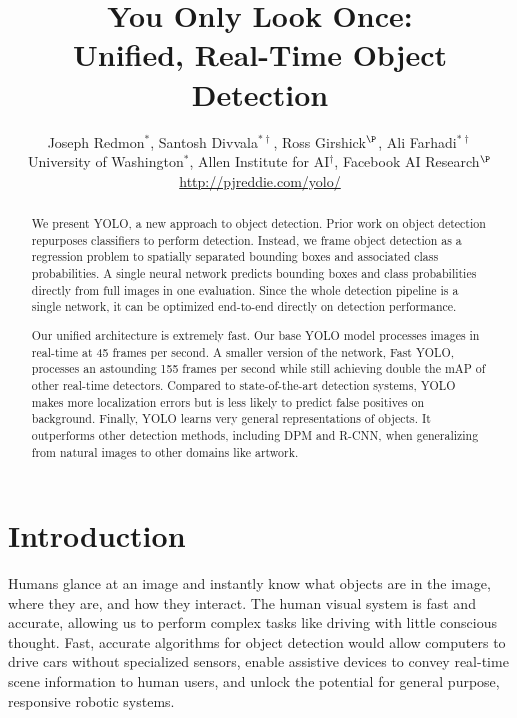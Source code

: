 \title{You Only Look Once: \\
Unified, Real-Time Object Detection}

\author{Joseph Redmon$^*$, Santosh Divvala$^{* \dag}$, Ross Girshick$^\P$, Ali Farhadi$^{* \dag}$\\
\small{University of Washington$^*$, Allen Institute for AI$^\dag$, Facebook AI Research$^\P$}\\ \url{http://pjreddie.com/yolo/}}

\begin{abstract}

We present YOLO, a new approach to object detection. Prior work on object detection repurposes classifiers to perform detection. Instead, we frame object detection as a regression problem to spatially separated bounding boxes and associated class probabilities. A single neural network predicts bounding boxes and class probabilities directly from full images in one evaluation. Since the whole detection pipeline is a single network, it can be optimized end-to-end directly on detection performance.

Our unified architecture is extremely fast. Our base YOLO model processes images in real-time at 45 frames per second. A smaller version of the network, Fast YOLO, processes an astounding 155 frames per second while still achieving double the mAP of other real-time detectors. Compared to state-of-the-art detection systems, YOLO makes more localization errors but is less likely to predict false positives on background. Finally, YOLO learns very general representations of objects. It outperforms other detection methods, including DPM and R-CNN, when generalizing from natural images to other domains like artwork.
\end{abstract}

\section{Introduction}

Humans glance at an image and instantly know what objects are in the image, where they are, and how they interact. The human visual system is fast and accurate, allowing us to perform complex tasks like driving with little conscious thought. Fast, accurate algorithms for object detection would allow computers to drive cars without specialized sensors, enable assistive devices to convey real-time scene information to human users, and unlock the potential for general purpose, responsive robotic systems.

